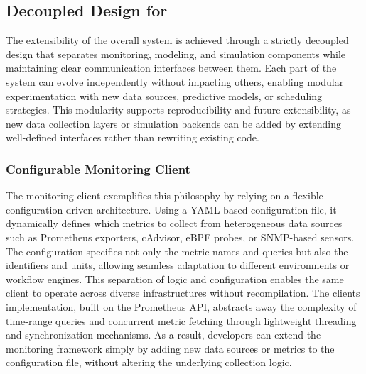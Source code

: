 \begin{table}[H]
{\begin{tabular}{
            p{4.5cm}
            >{\centering\arraybackslash}p{2.8cm}
            p{8.2cm}
            }
            \bottomrule
        \end{tabular}
    }
\end{table}


\subsection{Decoupled Design for }
\label{sec:extensibility_through_decoupled_design}
The extensibility of the overall system is achieved through a strictly decoupled design that separates monitoring, modeling, and simulation components while maintaining clear communication interfaces between them. Each part of the system can evolve independently without impacting others, enabling modular experimentation with new data sources, predictive models, or scheduling strategies. This modularity supports reproducibility and future extensibility, as new data collection layers or simulation backends can be added by extending well-defined interfaces rather than rewriting existing code.
\subsubsection{Configurable Monitoring Client}
\label{sec:monitoring_client}
The monitoring client exemplifies this philosophy by relying on a flexible configuration-driven architecture. Using a YAML-based configuration file, it dynamically defines which metrics to collect from heterogeneous data sources such as Prometheus exporters, cAdvisor, eBPF probes, or SNMP-based sensors. The configuration specifies not only the metric names and queries but also the identifiers and units, allowing seamless adaptation to different environments or workflow engines. This separation of logic and configuration enables the same client to operate across diverse infrastructures without recompilation. The clients implementation, built on the Prometheus API, abstracts away the complexity of time-range queries and concurrent metric fetching through lightweight threading and synchronization mechanisms. As a result, developers can extend the monitoring framework simply by adding new data sources or metrics to the configuration file, without altering the underlying collection logic.



